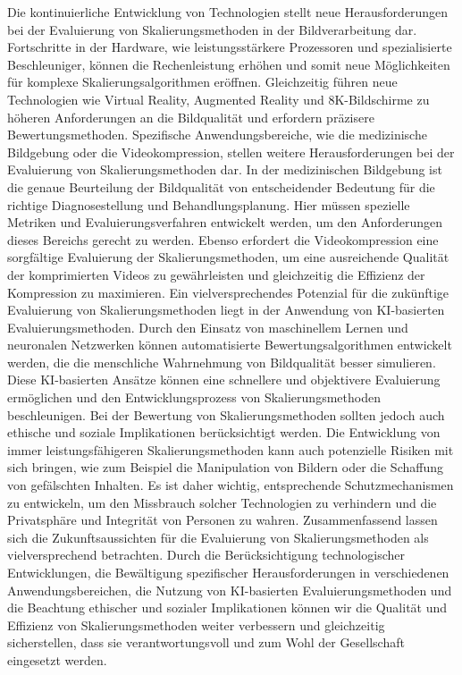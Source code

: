         Die kontinuierliche Entwicklung von Technologien stellt neue Herausforderungen bei der Evaluierung von Skalierungsmethoden in der Bildverarbeitung dar.
        Fortschritte in der Hardware, wie leistungsstärkere Prozessoren und spezialisierte Beschleuniger, können die Rechenleistung erhöhen und somit neue Möglichkeiten für komplexe Skalierungsalgorithmen eröffnen. Gleichzeitig führen neue Technologien wie Virtual Reality, Augmented Reality und 8K-Bildschirme zu höheren Anforderungen an die Bildqualität und erfordern präzisere Bewertungsmethoden.
        Spezifische Anwendungsbereiche, wie die medizinische Bildgebung oder die Videokompression, stellen weitere Herausforderungen bei der Evaluierung von Skalierungsmethoden dar. 
        In der medizinischen Bildgebung ist die genaue Beurteilung der Bildqualität von entscheidender Bedeutung für die richtige Diagnosestellung und Behandlungsplanung. 
        Hier müssen spezielle Metriken und Evaluierungsverfahren entwickelt werden, um den Anforderungen dieses Bereichs gerecht zu werden. 
        Ebenso erfordert die Videokompression eine sorgfältige Evaluierung der Skalierungsmethoden, um eine ausreichende Qualität der komprimierten Videos zu gewährleisten und gleichzeitig die Effizienz der Kompression zu maximieren.
        Ein vielversprechendes Potenzial für die zukünftige Evaluierung von Skalierungsmethoden liegt in der Anwendung von KI-basierten Evaluierungsmethoden. 
        Durch den Einsatz von maschinellem Lernen und neuronalen Netzwerken können automatisierte Bewertungsalgorithmen entwickelt werden, die die menschliche Wahrnehmung von Bildqualität besser simulieren. 
        Diese KI-basierten Ansätze können eine schnellere und objektivere Evaluierung ermöglichen und den Entwicklungsprozess von Skalierungsmethoden beschleunigen.
        Bei der Bewertung von Skalierungsmethoden sollten jedoch auch ethische und soziale Implikationen berücksichtigt werden. 
        Die Entwicklung von immer leistungsfähigeren Skalierungsmethoden kann auch potenzielle Risiken mit sich bringen, wie zum Beispiel die Manipulation von Bildern oder die Schaffung von gefälschten Inhalten. 
        Es ist daher wichtig, entsprechende Schutzmechanismen zu entwickeln, um den Missbrauch solcher Technologien zu verhindern und die Privatsphäre und Integrität von Personen zu wahren.
        Zusammenfassend lassen sich die Zukunftsaussichten für die Evaluierung von Skalierungsmethoden als vielversprechend betrachten. 
        Durch die Berücksichtigung technologischer Entwicklungen, die Bewältigung spezifischer Herausforderungen in verschiedenen Anwendungsbereichen, die Nutzung von KI-basierten Evaluierungsmethoden und die Beachtung ethischer und sozialer Implikationen können wir die Qualität und Effizienz von Skalierungsmethoden weiter verbessern und gleichzeitig sicherstellen, dass sie verantwortungsvoll und zum Wohl der Gesellschaft eingesetzt werden.
\newpage